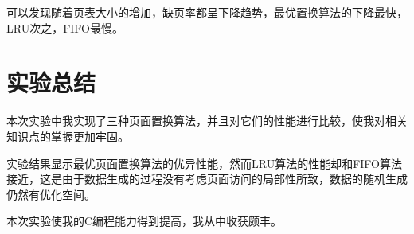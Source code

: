 \documentclass[lang=cn,11pt,a4paper,cite=authornum]{paper}
\begin{document}
可以发现随着页表大小的增加，缺页率都呈下降趋势，最优置换算法的下降最快，LRU次之，FIFO最慢。

\section{实验总结}

本次实验中我实现了三种页面置换算法，并且对它们的性能进行比较，使我对相关知识点的掌握更加牢固。

实验结果显示最优页面置换算法的优异性能，然而LRU算法的性能却和FIFO算法接近，这是由于数据生成的过程没有考虑页面访问的局部性所致，数据的随机生成仍然有优化空间。

本次实验使我的C编程能力得到提高，我从中收获颇丰。
\end{document}
